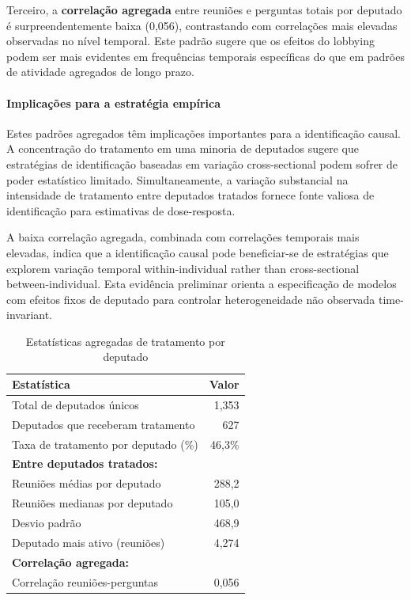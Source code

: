 Terceiro, a \textbf{correlação agregada} entre reuniões e perguntas totais por deputado é surpreendentemente baixa (0,056), contrastando com correlações mais elevadas observadas no nível temporal. Este padrão sugere que os efeitos do lobbying podem ser mais evidentes em frequências temporais específicas do que em padrões de atividade agregados de longo prazo.

\paragraph{Implicações para a estratégia empírica}

Estes padrões agregados têm implicações importantes para a identificação causal. A concentração do tratamento em uma minoria de deputados sugere que estratégias de identificação baseadas em variação cross-sectional podem sofrer de poder estatístico limitado. Simultaneamente, a variação substancial na intensidade de tratamento entre deputados tratados fornece fonte valiosa de identificação para estimativas de dose-resposta.

A baixa correlação agregada, combinada com correlações temporais mais elevadas, indica que a identificação causal pode beneficiar-se de estratégias que explorem variação temporal within-individual rather than cross-sectional between-individual. Esta evidência preliminar orienta a especificação de modelos com efeitos fixos de deputado para controlar heterogeneidade não observada time-invariant.

\begin{table}[htbp]
\centering
\caption{Estatísticas agregadas de tratamento por deputado}
\label{tab:mep_treatment_stats}
\begin{tabular}{lr}
\toprule
\textbf{Estatística} & \textbf{Valor} \\
\midrule
Total de deputados únicos & 1{,}353 \\
Deputados que receberam tratamento & 627 \\
Taxa de tratamento por deputado (\%) & 46{,}3\% \\
\midrule
\textbf{Entre deputados tratados:} & \\
Reuniões médias por deputado & 288{,}2 \\
Reuniões medianas por deputado & 105{,}0 \\
Desvio padrão & 468{,}9 \\
Deputado mais ativo (reuniões) & 4{,}274 \\
\midrule
\textbf{Correlação agregada:} & \\
Correlação reuniões-perguntas & 0{,}056 \\
\bottomrule
\end{tabular}
\end{table}

